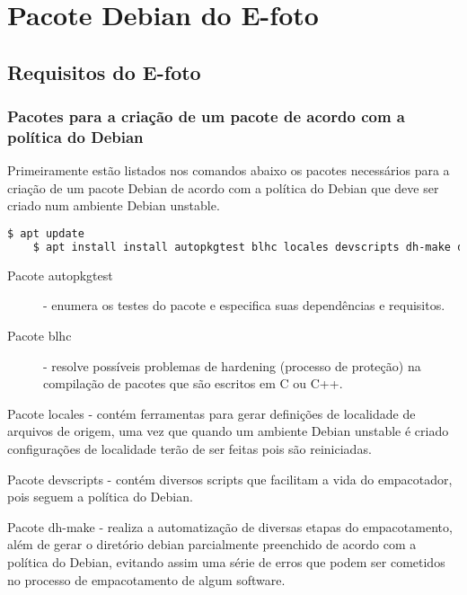 \chapter{Pacote Debian do E-foto}
\section{Requisitos do E-foto}

\subsection{Pacotes para a criação de um pacote de acordo com a política do Debian}

Primeiramente estão listados nos comandos abaixo os pacotes necessários para a criação de um pacote Debian de acordo com a política do Debian que deve ser criado num ambiente Debian unstable. 

\begin{lstlisting}[language=bash]
	$ apt update
	$ apt install install autopkgtest blhc locales devscripts dh-make dput-ng git-buildpackage mc quilt spell tardiff tree
\end{lstlisting}

\begin{description}
	\item[Pacote autopkgtest] - enumera os testes do pacote e especifica suas dependências e requisitos.
	\item[Pacote blhc] - resolve possíveis problemas de hardening (processo de proteção) na compilação de pacotes que são escritos em C ou C++.
\end{description}
 
 

Pacote locales - contém ferramentas para gerar definições de localidade de arquivos de origem, uma vez que quando um ambiente Debian unstable é criado configurações de localidade terão de ser feitas pois são reiniciadas.

Pacote devscripts - contém diversos scripts que facilitam a vida do empacotador, pois seguem a política do Debian. 

Pacote dh-make - realiza a automatização de diversas etapas do empacotamento, além de gerar o diretório debian parcialmente preenchido de acordo com a política do Debian, evitando assim uma série de erros que podem ser cometidos no processo de empacotamento de algum software.

